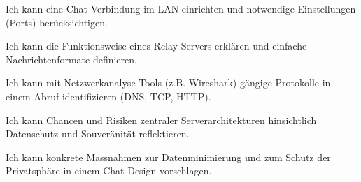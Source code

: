 \begin{todolist}
\item Ich kann eine Chat-Verbindung im \gls{LAN} einrichten und notwendige Einstellungen (Ports) berücksichtigen.
\item Ich kann die Funktionsweise eines Relay-Servers erklären und einfache Nachrichtenformate definieren.
\item Ich kann mit Netzwerkanalyse-Tools (z.B. Wireshark) gängige Protokolle in einem Abruf identifizieren (\gls{DNS}, \gls{TCP}, \gls{HTTP}).
\item Ich kann Chancen und Risiken zentraler Serverarchitekturen hinsichtlich Datenschutz und Souveränität reflektieren.
\item Ich kann konkrete Massnahmen zur Datenminimierung und zum Schutz der Privatsphäre in einem Chat-Design vorschlagen.
\end{todolist}
